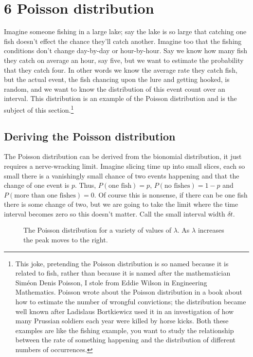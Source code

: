 \documentclass[11pt,a4paper]{scrartcl}
\begin{document}
\section*{6 Poisson distribution}

Imagine someone fishing in a large lake; say the lake is so large that
catching one fish doesn't effect the chance they'll catch
another. Imagine too that the fishing conditions don't change
day-by-day or hour-by-hour. Say we know how many fish they catch on
average an hour, say five, but we want to estimate the probability
that they catch four. In other words we know the average rate they
catch fish, but the actual event, the fish chancing upon the lure and
getting hooked, is random, and we want to know the distribution of this
event count over an interval. This distribution is an example of the
Poisson distribution and is the subject of this section.\footnote{This
  joke, pretending the Poisson distribution is so named because it is
  related to fish, rather than because it is named after the
  mathematician Sim\'{e}on Denis Poisson, I stole from Eddie Wilson in
  Engineering Mathematics. Poisson wrote about the Poisson
  distribution in a book about how to estimate the number of wrongful
  convictions; the distribution became well known after Ladislaus
  Bortkiewicz used it in an investigation of how many Prussian
  soldiers each year were killed by horse kicks. Both these examples
  are like the fishing example, you want to study the relationship
  between the rate of something happening and the distribution of
  different numbers of occurrences.}

\subsection*{Deriving the Poisson distribution}

The Poisson distribution can be derived from the bionomial
distribution, it just requires a nerve-wracking limit. Imagine slicing
time up into small slices, each so small there is a vanishingly small
chance of two events happening and that the change of one event is
$p$. Thus, $P(\mbox{one fish})=p$, $P(\mbox{no fishes})=1-p$ and
$P(\mbox{more than one fishes})=0$. Of course this is nonsense, if
there can be one fish there is some change of two, but we are going to
take the limit where the time interval becomes zero so this doesn't
matter. Call the small interval width $\delta t$.


\begin{figure}[tb]
\begin{center}

\end{center}
\caption{The Poisson distribution for a variety of values of $\lambda$. As $\lambda$ increases the peak moves to the right.\label{fig_dist}}
\end{figure}
\end{document}
